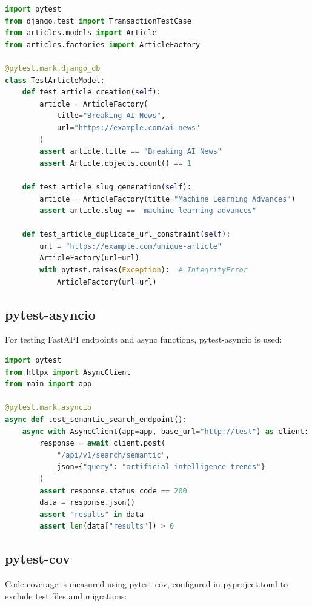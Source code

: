 \documentclass{report}
\begin{document}
\begin{lstlisting}[language=Python, caption=Basic pytest usage in SYNAPSE]
import pytest
from django.test import TransactionTestCase
from articles.models import Article
from articles.factories import ArticleFactory

@pytest.mark.django_db
class TestArticleModel:
    def test_article_creation(self):
        article = ArticleFactory(
            title="Breaking AI News",
            url="https://example.com/ai-news"
        )
        assert article.title == "Breaking AI News"
        assert Article.objects.count() == 1

    def test_article_slug_generation(self):
        article = ArticleFactory(title="Machine Learning Advances")
        assert article.slug == "machine-learning-advances"

    def test_article_duplicate_url_constraint(self):
        url = "https://example.com/unique-article"
        ArticleFactory(url=url)
        with pytest.raises(Exception):  # IntegrityError
            ArticleFactory(url=url)
\end{lstlisting}

\subsection{pytest-asyncio}

For testing FastAPI endpoints and async functions, pytest-asyncio is used:

\begin{lstlisting}[language=Python, caption=Testing async FastAPI endpoints]
import pytest
from httpx import AsyncClient
from main import app

@pytest.mark.asyncio
async def test_semantic_search_endpoint():
    async with AsyncClient(app=app, base_url="http://test") as client:
        response = await client.post(
            "/api/v1/search/semantic",
            json={"query": "artificial intelligence trends"}
        )
        assert response.status_code == 200
        data = response.json()
        assert "results" in data
        assert len(data["results"]) > 0
\end{lstlisting}

\subsection{pytest-cov}

Code coverage is measured using pytest-cov, configured in pyproject.toml to exclude test files and migrations:
\end{document}
